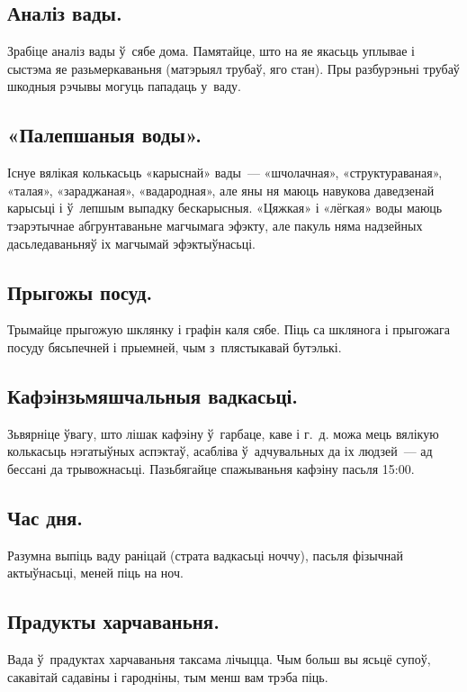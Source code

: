 \subsection{Аналіз вады.}
Зрабіце аналіз вады ў~сябе дома. Памятайце, што на яе якасьць уплывае і сыстэма яе разьмеркаваньня (матэрыял трубаў, яго стан). Пры разбурэньні трубаў шкодныя рэчывы могуць пападаць у~ваду.

\subsection{«Палепшаныя воды».}
Існуе вялікая колькасьць «карыснай» вады~--- «шчолачная», «структураваная», «талая», «зараджаная», «вадародная», але яны ня маюць навукова даведзенай карысьці і ў~лепшым выпадку бескарысныя. «Цяжкая» і «лёгкая» воды маюць тэарэтычнае абгрунтаваньне магчымага эфэкту, але пакуль няма надзейных дасьледаваньняў іх магчымай эфэктыўнасьці.


\subsection{Прыгожы посуд.}
Трымайце прыгожую шклянку і графін каля сябе. Піць са шклянога і прыгожага посуду бясьпечней і прыемней, чым з~плястыкавай бутэлькі.

\subsection{Кафэінзьмяшчальныя вадкасьці.}
Зьвярніце ўвагу, што лішак кафэіну ў~гарбаце, каве і г.~д. можа мець вялікую колькасьць нэгатыўных аспэктаў, асабліва ў~адчувальных да іх людзей~--- ад бессані да трывожнасьці. Пазьбягайце спажываньня кафэіну пасьля 15:00.

\subsection{Час дня.}
Разумна выпіць ваду раніцай (страта вадкасьці ноччу), пасьля фізычнай актыўнасьці, меней піць на ноч.

\subsection{Прадукты харчаваньня.}
Вада ў~прадуктах харчаваньня таксама лічыцца. Чым больш вы ясьцё супоў, сакавітай садавіны і гародніны, тым менш вам трэба піць.

